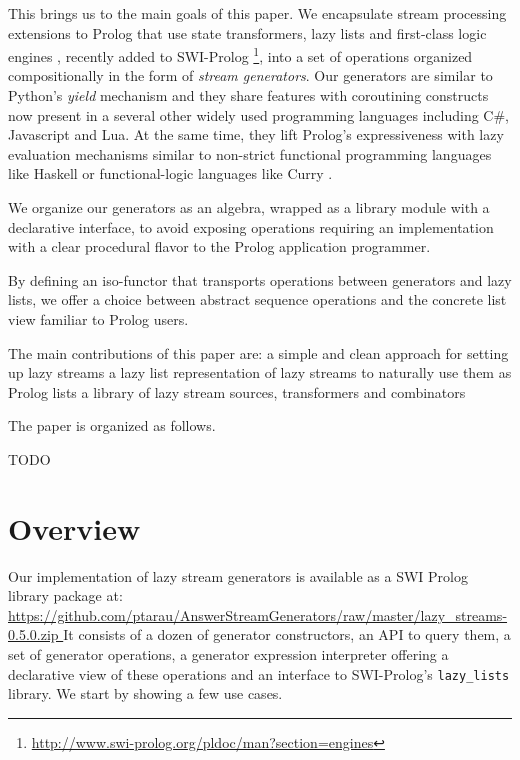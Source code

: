 \documentclass{new_tlp}
\begin{document}
This brings us to the main goals of this paper. 
We encapsulate stream processing extensions to Prolog that use
state transformers, lazy lists and first-class logic engines 
\cite{tarau:cl2000,padl09inter,bp2011}, 
recently added to SWI-Prolog
\footnote{\url{http://www.swi-prolog.org/pldoc/man?section=engines}},
into a set of operations organized compositionally in the form of {\em 
stream generators}.
Our generators are similar to Python's {\em yield} mechanism \cite{beazley09} and 
they share features with coroutining constructs now present in a several other widely used programming languages including C\#, Javascript and Lua. At the same time, 
they lift Prolog's expressiveness with lazy evaluation mechanisms similar to non-strict
functional programming languages like Haskell \cite{hudak07} or functional-logic languages like Curry \cite{antoy05}.

We organize our generators as an algebra, wrapped as a library module with a declarative interface, to avoid exposing  operations requiring an implementation with a clear procedural flavor to the Prolog application programmer.

By defining an iso-functor that transports operations between
generators and lazy lists, we offer a choice between 
abstract sequence operations and the concrete list view familiar to Prolog users.

The main contributions of this paper are:
\BI
\I a simple and clean approach for setting up lazy streams
\I a lazy list representation of lazy streams to naturally use them as Prolog lists
\I a library of lazy stream sources, transformers and combinators %
\EI



The paper is organized as follows.

{\Large TODO}

\section{Overview}

Our implementation of lazy stream generators 
is available as a SWI Prolog library package at:\\
{\small \url{https://github.com/ptarau/AnswerStreamGenerators/raw/master/lazy_streams-0.5.0.zip } }
It consists of a dozen of generator constructors, an API to query them, a set of generator  operations, a generator expression interpreter offering a declarative view of
these operations and an interface to SWI-Prolog's {\tt lazy\_lists} library. We start by showing a few use cases.
\end{document}
